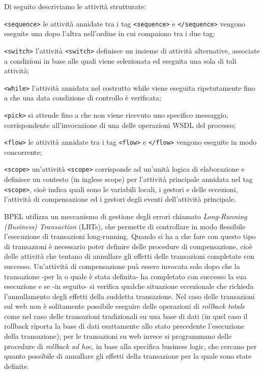 Di seguito descriviamo le attività strutturate:

\texttt{<sequence>} le attività annidate tra i tag \texttt{<sequence>} e
\texttt{</sequence>} vengono eseguite  una dopo l'altra nell'ordine in cui
compaiono tra i due tag;

\texttt{<switch>} l'attività \texttt{<switch>} definisce un insieme di attività
alternative, associate a condizioni in base alle quali viene selezionata ed eseguita
una sola di tali attività;

\texttt{<while>} l’attività annidata nel costrutto while viene eseguita
ripetutamente fino a che una data condizione di controllo è verificata;                             

\texttt{<pick>} si attende fino a che non viene ricevuto uno specifico
messaggio, corrispondente all'invocazione di una delle operazioni WSDL del processo;

\texttt{<flow>} le attività annidate tra i tag \texttt{<flow>} e
\texttt{</flow>} vengono eseguite in modo concorrente;

\texttt{<scope>} un'attività \texttt{<scope>} corrisponde ad un'unità logica di
elaborazione e definisce un contesto (in inglese scope) per l'attività principale annidata 
nel tag \texttt{<scope>}, cioè indica quali sono le variabili locali, i gestori
e delle eccezioni, l'attività di compensazione ed i gestori degli eventi dell'attività principale.

BPEL utilizza un meccanismo di gestione degli errori chiamato \emph{Long-Running
(Business) Transaction} (LRTs), che permette di controllare in modo flessibile
l'esecuzione di transazioni long-running.
Quando si ha a che fare con questo tipo di transazioni è necessario poter
definire delle procedure di compensazione, cioè delle attività che tentano di
annullare gli effetti delle transazioni completate con successo. Un'attività di
compensazione puà essere invocata solo dopo che la transazione -per la o
quale è stata definita- ha completato con successo la sua esecuzione e se -in
seguito- si verifica qualche situazione eccezionale che richieda l'annullamento
degli effetti della suddetta transazione. Nel caso delle transazioni sul web
non è solitamente possibile eseguire delle operazioni di \emph{rollback totale}
come nel caso delle transazioni tradizionali su una base di dati (in quel caso il
rollback riporta la base di dati esattamente allo stato precedente l'esecuzione
della transazione); per le transazioni su web invece si programmano delle
procedure di \emph{rollback ad hoc}, in base alla specifica business logic, che
cercano per quanto possibile di annullare gli effetti della transazione per la quale sono
state definite.

